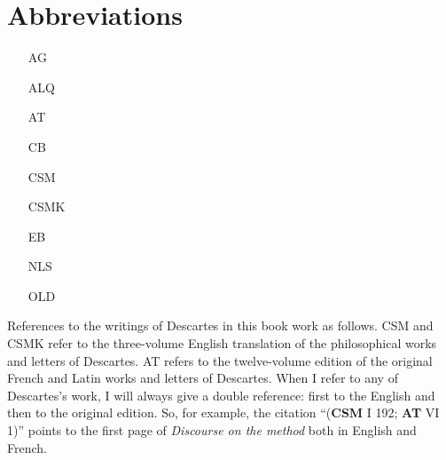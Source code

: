 \chapter{Abbreviations}

\begin{itemize}
    \item[AG] 
    \item[ALQ] 
    \item[AT] 
    \item[CB] 
    \item[CSM] 
    \item[CSMK] 
    \item[EB] 
    \item[NLS] 
    \item[OLD] 
\end{itemize}

References to the writings of Descartes in this book work as follows. CSM and CSMK refer to the three-volume English translation of the philosophical works and letters of Descartes. AT refers to the twelve-volume edition of the original French and Latin works and letters of Descartes. When I refer to any of Descartes's work, I will always give a double reference: first to the English and then to the original edition. So, for example, the citation ``(\textbf{CSM} I 192; \textbf{AT} VI 1)'' points to the first page of \textit{Discourse on the method} both in English and French.

